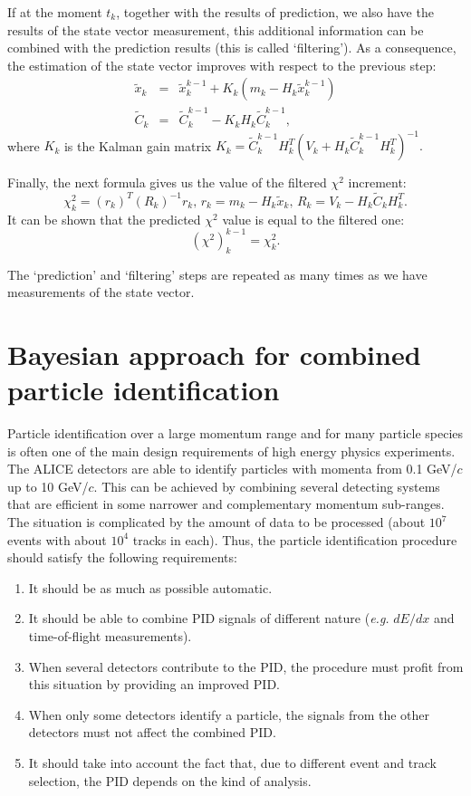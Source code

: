 \documentclass[12pt,a4paper,twoside]{article}
\begin{document}
{If at the moment $t_k$, together with the results of prediction, we also
have the results of the state vector measurement, 
this additional information can be combined with the prediction  results
(this is called `filtering'). As a consequence, the estimation of the state
vector improves with respect to the previous step:
\begin{eqnarray}
  \tilde{x}_k &=& \tilde{x}_k^{k-1} + K_k(m_k - H_k\tilde{x}_k^{k-1})\nonumber\\
  \tilde{C}_k &=& \tilde{C}_k^{k-1} - K_kH_k\tilde{C}_k^{k-1},
  \nonumber
\end{eqnarray}
where $K_k$ is the Kalman gain matrix
$
K_k = \tilde{C}_k^{k-1}H_k^T(V_k + H_k\tilde{C}_k^{k-1}H_k^T)^{-1}.
$

Finally, the next formula gives us the value of the filtered $\chi^2$ increment:
\[
\chi^2_k = (r_k)^T(R_k)^{-1}r_k\mbox{,\ \ \ \ }
r_k = m_k - H_k\tilde{x}_k\mbox{,\ \ \ \ }
R_k = V_k - H_k\tilde{C}_kH_k^T .
\]
It can be shown that the predicted $\chi^2$ value is equal to the filtered
one:
\begin{equation}
  (\chi^2)_k^{k-1} = \chi^2_k \label{chi=chi} .
\end{equation}

The `prediction' and `filtering' steps are repeated as many times as we have
measurements of the state vector. 

\section {Bayesian approach for combined particle identification}\label{BayesianPID}

Particle identification over a large momentum range and
for many particle species is often one of the main design
requirements of high energy physics experiments. 
The ALICE detectors are able to   
identify particles with momenta from 0.1 GeV/$c$ up to
10 GeV/$c$. This can be achieved by combining
several detecting systems that are efficient in some narrower and 
complementary momentum sub-ranges. The situation is complicated by 
the amount of data to be processed (about $10^7$ events with 
about $10^4$ tracks in each). Thus, the particle identification 
procedure should satisfy the following 
requirements:
\begin{enumerate}
\item It should be as much as possible automatic. 
\item It should be able to combine PID signals of different nature 
({\it e.g.} $dE/dx$ and time-of-flight measurements).
\item When several detectors contribute to the PID, the procedure must profit
 from this situation by providing an improved PID.
\item When only some detectors identify a particle, the signals from the other
 detectors must not affect the combined PID.
\item It should take into account the fact that, due to 
different event and track selection, the PID depends on the kind of analysis.
\end{enumerate}

}
\end{document}
